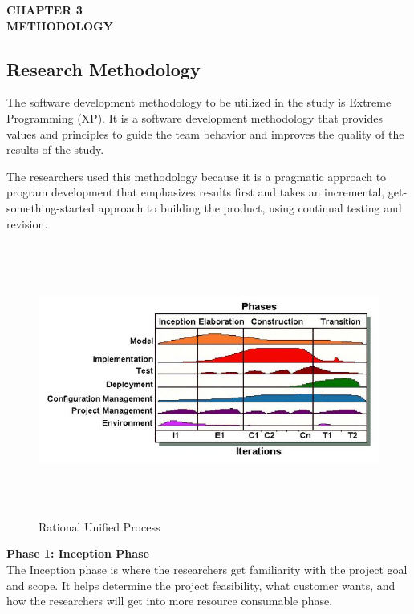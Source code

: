 \clearpage
\thispagestyle{empty}

\begin{center}
	\textbf{{CHAPTER 3}}\\
	\vspace{-1ex}
	\textbf{METHODOLOGY}
	\vspace{-3ex}
\end{center}
\subsection{Research Methodology}
\vspace{-2ex}
The software development methodology to be utilized in the study is Extreme Programming (XP). It is a software development methodology that provides values and principles to guide the team behavior and improves the quality of the results of the study.

The researchers used this methodology because it is a pragmatic approach to program development that emphasizes results first and takes an incremental, get-something-started approach to building the product, using continual testing and revision.

\begin{figure}[H]
	\centering
	\includegraphics[width=15cm,height=9cm]{image/3-1.jpg}
	\caption{Rational Unified Process}
\end{figure}

\noindent\textbf{Phase 1:  Inception Phase}\\
\hspace*{1.5cm}The Inception phase is where the researchers get familiarity with the project goal and scope. It helps determine the project feasibility, what customer wants, and how the researchers will get into more resource consumable phase.
	
